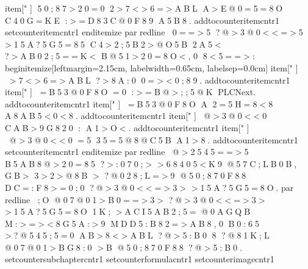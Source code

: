 { 
 	 	 
 
 	 	 \ i t e m [ "   ]    50;87>20=0  2>7<>6=>ABL  A>E@0=5=8O  C40G=KE  :>=D83C@0F89  A5B8. 	 	 
 
 	 	 \ a d d t o c o u n t e r { i t e m c n t r } { 1 } 
 
 	 	 
 
 	 	 \ s e t c o u n t e r { i t e m c n t r } { 1 } 
 
 	 \ e n d { i t e m i z e }   
 
 
 
 	 \ p a r   \ r e d l i n e   0==>5  ?@>3@0<<=>5  >15A?5G5=85  C4>2;5B2>@O5B  2A5<  ?>AB02;5==K<  B@51>20=8O<,   0  8<5==>: 
 
 	 
 
 	 \ b e g i n { i t e m i z e } [ l e f t m a r g i n = 2 . 1 5 c m ,   l a b e l w i d t h = 0 . 6 5 c m ,   l a b e l s e p = 0 . 0 c m ]   
 
 	 	 
 
 	 	 \ i t e m [ "   ]   >7<>6=>ABL  ?>8A:0  0=><0;89. 	 
 
 	 	 \ a d d t o c o u n t e r { i t e m c n t r } { 1 } 
 
 	 	 
 
 	 	 \ i t e m [ "   ]   =B53@0F8O  =0  :>=B@>;;5@K  P L C N e x t . 	 	 
 
 	 	 \ a d d t o c o u n t e r { i t e m c n t r } { 1 } 
 
 	 	 
 
 	 	 \ i t e m [ "   ]   =B53@0F8O  A  2=5H=8<8  A8AB5<0<8.   	 	 
 
 	 	 \ a d d t o c o u n t e r { i t e m c n t r } { 1 } 
 
 	 	 
 
 	 	 \ i t e m [ "   ]   @>3@0<<0  CAB>9G820  :  A1>O<. 	 	 
 
 	 	 \ a d d t o c o u n t e r { i t e m c n t r } { 1 } 
 
 	 	 
 
 	 	 \ i t e m [ "   ]   @>3@0<<0  =5  35=5@8@C5B  A1>8. 	 	 
 
 	 	 \ a d d t o c o u n t e r { i t e m c n t r } { 1 } 
 
 	 	 
 
 	 	 
 
 	 	 \ s e t c o u n t e r { i t e m c n t r } { 1 } 
 
 	 \ e n d { i t e m i z e }     
 
 	     
 
 	 \ p a r   \ r e d l i n e   @>2545==>5  B5AB8@>20=85  ?>:070;>  >68405<K9  @57C;LB0B,   GB>  3>2>@8B  >  ?@028;L=>9  @50;870F88  DC=:F8>=0;0  ?@>3@0<<=>3>  >15A?5G5=8O.   
 
 	 \ p a r   \ r e d l i n e   ;O  @07@01>B0==>3>  ?@>3@0<<=>3>  >15A?5G5=8O  1K;  >ACI5AB2;5=  @0AGQB  M:>=><8G5A:>9  MDD5:B82=>AB8,   0  B0:65  >?@545;5=0  AB>8<>ABL  ?@>5:B0  8  ?@81K;L  @07@01>BG8:0  >B  @50;870F88  ?@>5:B0. 
 
 	 
 
 	 
 
 
 
 	 
 
 } 
 
 
 
 \ s e t c o u n t e r { s u b c h a p t e r c n t r } { 1 } 
 
 \ s e t c o u n t e r { f o r m u l a c n t r } { 1 } 
 
 \ s e t c o u n t e r { i m a g e c n t r } { 1 } 